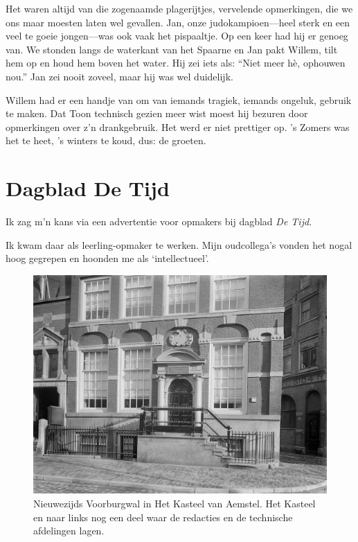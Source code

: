 \documentclass[10pt,twoside, openright]{memoir}
\begin{document}
Het waren altijd van die zogenaamde plagerijtjes, vervelende opmerkingen, die we ons maar moesten laten wel gevallen. Jan, onze judokampioen---heel sterk en een veel te goeie jongen---was ook vaak het pispaaltje. Op een keer had hij er genoeg van. We stonden langs de waterkant van het Spaarne en Jan pakt Willem, tilt hem op en houd hem boven het water. Hij zei iets als: ``Niet meer hè, ophouwen nou.'' Jan zei nooit zoveel, maar hij was wel duidelijk.

Willem had er een handje van om van iemands tragiek, iemands ongeluk, gebruik te maken. Dat Toon technisch gezien meer wist moest hij bezuren door opmerkingen over z’n drankgebruik. Het werd er niet prettiger op. ’s Zomers was het te heet, ’s winters te koud, dus: de groeten.

\chapter{Dagblad De Tijd} %
\label{cha:detijd}

Ik zag m’n kans via een advertentie voor opmakers bij dagblad \emph{De Tijd}.

Ik kwam daar als leerling-opmaker te werken. Mijn oudcollega’s vonden het nogal hoog gegrepen en hoonden me als `intellectueel'.

\begin{figure}
\includegraphics[width=\textwidth]{img/ch39/image}
\caption*{\footnotesize Nieuwezijds Voorburgwal in Het Kasteel van Aemstel. Het Kasteel en naar links nog een deel waar de redacties en de technische afdelingen lagen.}
\end{figure}
\end{document}
